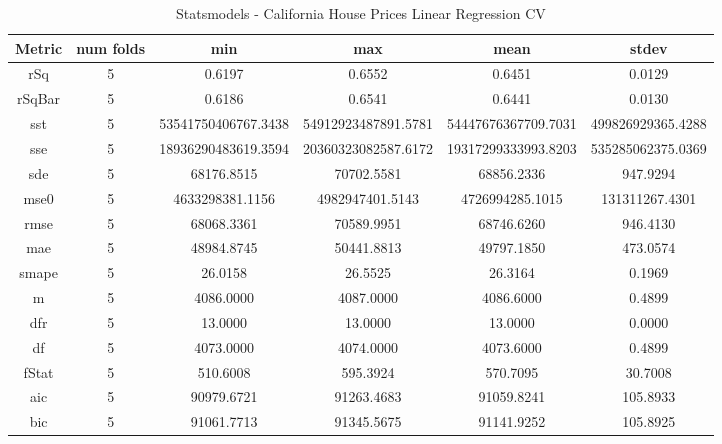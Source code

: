 \documentclass{article}
\begin{document}
\begin{table}[H]
\centering
\caption{Statsmodels - California House Prices Linear Regression CV}
\label{tab:Statsmodels - California House Prices Linear Regression CV}
\begin{tabular}{|c|c|c|c|c|c|}\hline
Metric & num folds & min & max & mean & stdev \\ \hline \hline
rSq & 5 & 0.6197 & 0.6552 & 0.6451 & 0.0129 \\ \hline
rSqBar & 5 & 0.6186 & 0.6541 & 0.6441 & 0.0130 \\ \hline
sst & 5 & 53541750406767.3438 & 54912923487891.5781 & 54447676367709.7031 & 499826929365.4288 \\ \hline
sse & 5 & 18936290483619.3594 & 20360323082587.6172 & 19317299333993.8203 & 535285062375.0369 \\ \hline
sde & 5 & 68176.8515 & 70702.5581 & 68856.2336 & 947.9294 \\ \hline
mse0 & 5 & 4633298381.1156 & 4982947401.5143 & 4726994285.1015 & 131311267.4301 \\ \hline
rmse & 5 & 68068.3361 & 70589.9951 & 68746.6260 & 946.4130 \\ \hline
mae & 5 & 48984.8745 & 50441.8813 & 49797.1850 & 473.0574 \\ \hline
smape & 5 & 26.0158 & 26.5525 & 26.3164 & 0.1969 \\ \hline
m & 5 & 4086.0000 & 4087.0000 & 4086.6000 & 0.4899 \\ \hline
dfr & 5 & 13.0000 & 13.0000 & 13.0000 & 0.0000 \\ \hline
df & 5 & 4073.0000 & 4074.0000 & 4073.6000 & 0.4899 \\ \hline
fStat & 5 & 510.6008 & 595.3924 & 570.7095 & 30.7008 \\ \hline
aic & 5 & 90979.6721 & 91263.4683 & 91059.8241 & 105.8933 \\ \hline
bic & 5 & 91061.7713 & 91345.5675 & 91141.9252 & 105.8925 \\ \hline
\end{tabular}
\end{table}
\end{document}

